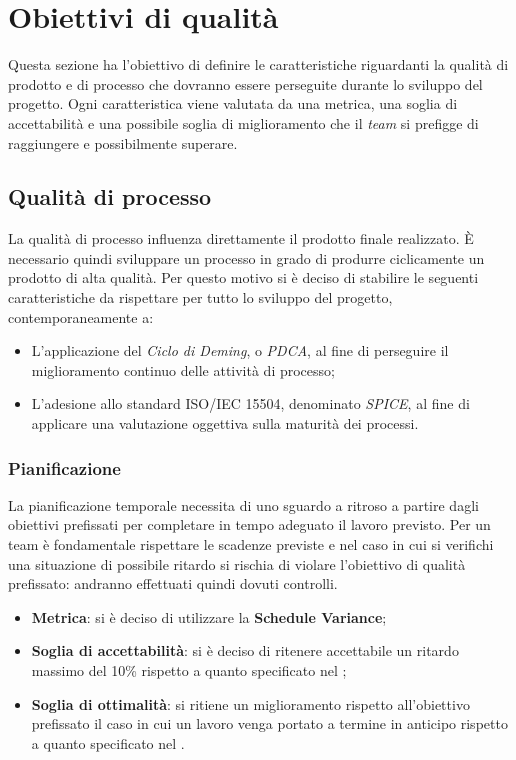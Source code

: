 \section{Obiettivi di qualità}
Questa sezione ha l'obiettivo di definire le caratteristiche riguardanti la qualità di prodotto e di processo che dovranno essere perseguite durante lo sviluppo del progetto.
Ogni caratteristica viene valutata da una metrica, una soglia di accettabilità e una possibile soglia di miglioramento che il \emph{team} si prefigge di raggiungere e possibilmente superare.

\subsection{Qualità di processo}
La qualità di processo influenza direttamente il prodotto finale realizzato. È necessario quindi sviluppare un processo in grado di produrre ciclicamente un prodotto di alta qualità. Per questo motivo si è deciso di stabilire le seguenti caratteristiche da rispettare per tutto lo sviluppo del progetto, contemporaneamente a:
	\begin{itemize}
	\item L'applicazione del \emph{Ciclo di Deming}, o \emph{PDCA}, al fine di perseguire il miglioramento continuo delle attività di processo;
	\item L'adesione allo standard ISO/IEC 15504, denominato \emph{SPICE}, al fine di applicare una valutazione oggettiva sulla maturità dei processi.
	\end{itemize} 

\subsubsection{Pianificazione}
La pianificazione temporale necessita di uno sguardo a ritroso a partire dagli obiettivi prefissati per completare in tempo adeguato il lavoro previsto. Per un team è fondamentale rispettare le scadenze previste e nel caso in cui si verifichi una situazione di possibile ritardo si rischia di violare l'obiettivo di qualità prefissato: andranno effettuati quindi dovuti controlli.
\begin{itemize}
	\item \textbf{Metrica}: si è deciso di utilizzare la \textbf{Schedule Variance};
	\item \textbf{Soglia di accettabilità}: si è deciso di ritenere accettabile un ritardo massimo del 10\% rispetto a quanto specificato nel \PdP{};
	\item \textbf{Soglia di ottimalità}: si ritiene un miglioramento rispetto all'obiettivo prefissato il caso in cui un lavoro venga portato a termine in anticipo rispetto a quanto specificato nel \PdP{}.
\end{itemize}

